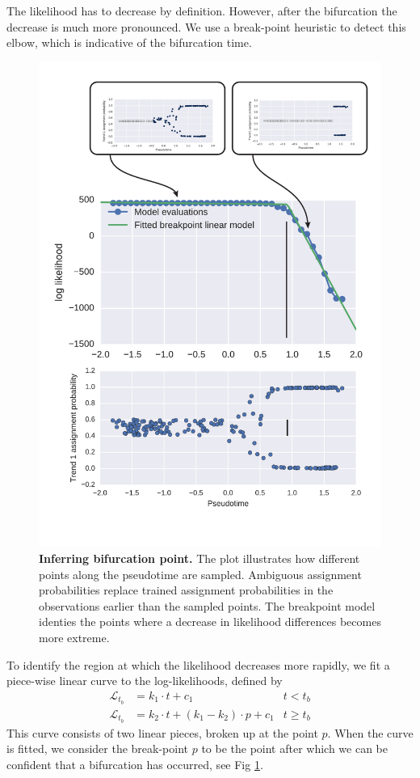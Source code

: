 The likelihood has to decrease by definition. However, after the bifurcation the decrease is much more pronounced. We use a break-point heuristic to detect this elbow, which is indicative of the bifurcation time.

\begin{figure}
    \centering
    \includegraphics[width=\textwidth]{"fig-bifurcation-detection"}
    \caption[Inferring bifurcation point]{\textbf{Inferring bifurcation point.} The plot illustrates how different points along the pseudotime are sampled. Ambiguous assignment probabilities replace trained assignment probabilities in the observations earlier than the sampled points. The breakpoint model identies the points where a decrease in likelihood differences becomes more extreme.}
    \label{fig:bifdetection}
\end{figure}

To identify the region at which the likelihood decreases more rapidly, we fit a piece-wise linear curve to the log-likelihoods, defined by
\begin{align*}
\mathcal{L}_{t_b} &= k_1 \cdot t + c_1 & t < t_b \\
\mathcal{L}_{t_b} &= k_2 \cdot t + (k_1 - k_2) \cdot p + c_1 & t \geq t_b
\end{align*}
This curve consists of two linear pieces, broken up at the point $ p $. When the curve is fitted, we consider the break-point $ p $ to be the point after which we can be confident that a bifurcation has occurred, see Fig \ref{fig:bifdetection}.

